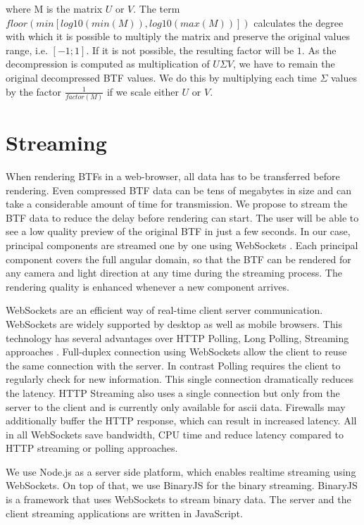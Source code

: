  where M is the matrix $U$ or $V$. The term $floor(min[log10(min(M)),log10(max(M))])$ calculates the degree with which it is possible to multiply the matrix and preserve the original values range, i.e. $[-1;1]$.
 If it is not possible, the resulting factor will be $1$.
As the decompression is computed as multiplication of $U\Sigma V$, we have to remain the original decompressed BTF values.
We do this by  multiplying each time $\Sigma$ values by the factor $\tfrac{1}{factor(M)}$ if we scale either $U$ or $V$.


 
\section{Streaming}
\label{section:impl_streaming}

When rendering BTFs in a web-browser, all data has to be transferred before rendering.
Even compressed BTF data can be tens of megabytes in size and can take a considerable amount of time for transmission.
We propose to stream the BTF data to reduce the delay before rendering can start.
 The user will be able to see a low quality preview of the original BTF in just a few seconds. 
In our case, principal components are streamed one by one using WebSockets \cite{WebSockets}.
Each principal component covers the full angular domain, so that the BTF can be rendered for any camera and light direction at any time during the streaming process.
The rendering quality is enhanced whenever a new component arrives.


 WebSockets are an efficient way of real-time client server communication.
 WebSockets are widely supported by desktop as well as mobile browsers.
This technology has several advantages over HTTP Polling, Long Polling, Streaming approaches \cite[Ch.\ 1]{WebSockets}.  
Full-duplex connection using WebSockets allow the client to reuse the same connection with the server.
In contrast Polling requires the client to regularly check for new information.
 This single connection dramatically reduces the latency.
HTTP Streaming also uses a single connection but only from the server to the client and is currently only available for ascii  data. 
Firewalls may additionally buffer the HTTP response, which can result in increased latency.
All in all WebSockets save bandwidth, CPU time and reduce  latency compared to HTTP streaming or polling approaches.

We use Node.js \cite{nodejs} as a server side platform, which enables realtime streaming using WebSockets. On top of that, we use BinaryJS \cite{binaryjs} for the binary streaming.
BinaryJS is a framework that uses WebSockets to stream  binary data.
The server and the client streaming applications are written in JavaScript.




